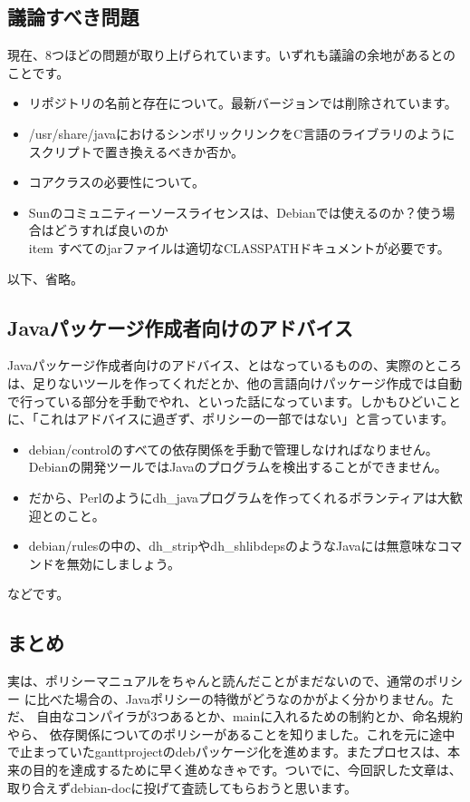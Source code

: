 \documentclass[mingoth,a4paper]{jsarticle}
\begin{document}
\subsection{議論すべき問題}
現在、8つほどの問題が取り上げられています。いずれも議論の余地があるとのことです。
\begin{itemize}
\item リポジトリの名前と存在について。最新バージョンでは削除されています。
\item /usr/share/javaにおけるシンボリックリンクをC言語のライブラリのようにスクリプトで置き換えるべきか否か。
\item コアクラスの必要性について。
\item Sunのコミュニティーソースライセンスは、Debianでは使えるのか？使う場合はどうすれば良いのか\\item すべてのjarファイルは適切なCLASSPATHドキュメントが必要です。
\end{itemize}
以下、省略。


\subsection{Javaパッケージ作成者向けのアドバイス}
Javaパッケージ作成者向けのアドバイス、とはなっているものの、実際のところは、足りないツールを作ってくれだとか、他の言語向けパッケージ作成では自動で行っている部分を手動でやれ、といった話になっています。しかもひどいことに、「これはアドバイスに過ぎず、ポリシーの一部ではない」と言っています。

\begin{itemize}
\item debian/controlのすべての依存関係を手動で管理しなければなりません。Debianの開発ツールではJavaのプログラムを検出することができません。
\item だから、Perlのようにdh\_javaプログラムを作ってくれるボランティアは大歓迎とのこと。
\item debian/rulesの中の、dh\_stripやdh\_shlibdepsのようなJavaには無意味なコマンドを無効にしましょう。
\end{itemize}
などです。

\subsection{まとめ}
実は、ポリシーマニュアルをちゃんと読んだことがまだないので、通常のポリシー
に比べた場合の、Javaポリシーの特徴がどうなのかがよく分かりません。ただ、
自由なコンパイラが3つあるとか、mainに入れるための制約とか、命名規約やら、
依存関係についてのポリシーがあることを知りました。これを元に途中で止まっていたganttprojectのdebパッケージ化を進めます。またプロセスは、本来の目的を達成するために早く進めなきゃです。ついでに、今回訳した文章は、取り合えずdebian-docに投げて査読してもらおうと思います。
\end{document}
